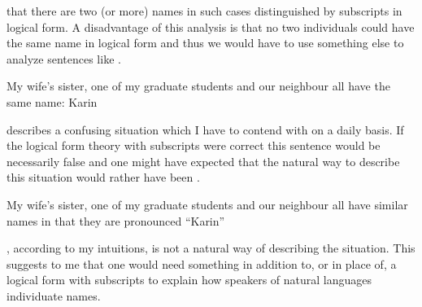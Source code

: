 that there are two (or more) names in such cases distinguished by
subscripts in logical form.  A disadvantage of this analysis is that
no two individuals could have the same name in logical form and thus
we would have to use something else to analyze sentences like \nexteg{}.
\begin{ex} 
My wife's sister, one of my graduate students and our
  neighbour all have the same name: Karin 
\end{ex} 
\preveg{} describes a confusing situation
which I have to contend with on a daily basis.  If the logical form
theory with subscripts were correct this sentence would be necessarily
false and one might have expected that the
natural way to describe this situation would rather have been
\nexteg{}.
\begin{ex} 
My wife's sister, one of my graduate students and our neighbour all
have similar names in that they are pronounced ``Karin'' 
\end{ex} 
\preveg{}, according to my intuitions, is not a natural way of
describing the situation.  This suggests to me that one would need
something in addition to, or in place of, a logical form with subscripts to explain how
speakers of natural languages individuate names.

